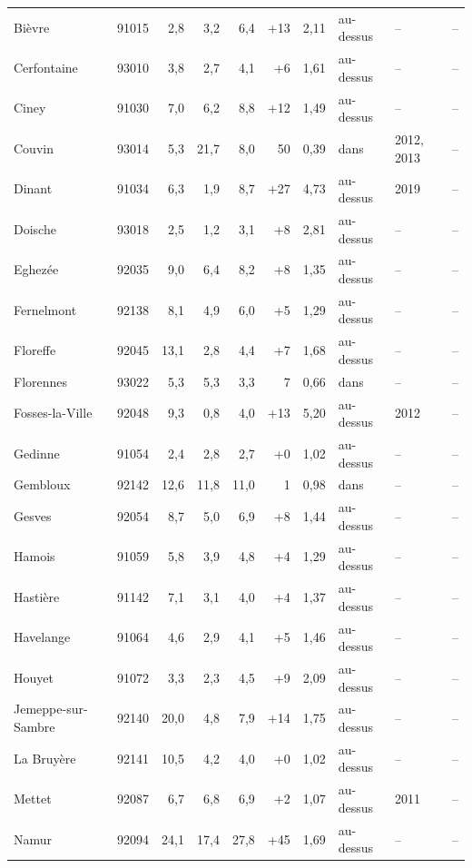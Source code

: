 \begin{longtable}{lrrrrrrlll}
Bièvre & 91015 & 2{,}8 & 3{,}2 & 6{,}4 & +13 & 2{,}11 & au-dessus & -- & -- \\
Cerfontaine & 93010 & 3{,}8 & 2{,}7 & 4{,}1 & +6 & 1{,}61 & au-dessus & -- & -- \\
Ciney & 91030 & 7{,}0 & 6{,}2 & 8{,}8 & +12 & 1{,}49 & au-dessus & -- & -- \\
Couvin & 93014 & 5{,}3 & 21{,}7 & 8{,}0 & \textminus{}50 & 0{,}39 & dans & 2012, 2013 & -- \\
Dinant & 91034 & 6{,}3 & 1{,}9 & 8{,}7 & +27 & 4{,}73 & au-dessus & 2019 & -- \\
Doische & 93018 & 2{,}5 & 1{,}2 & 3{,}1 & +8 & 2{,}81 & au-dessus & -- & -- \\
Eghezée & 92035 & 9{,}0 & 6{,}4 & 8{,}2 & +8 & 1{,}35 & au-dessus & -- & -- \\
Fernelmont & 92138 & 8{,}1 & 4{,}9 & 6{,}0 & +5 & 1{,}29 & au-dessus & -- & -- \\
Floreffe & 92045 & 13{,}1 & 2{,}8 & 4{,}4 & +7 & 1{,}68 & au-dessus & -- & -- \\
Florennes & 93022 & 5{,}3 & 5{,}3 & 3{,}3 & \textminus{}7 & 0{,}66 & dans & -- & -- \\
Fosses-la-Ville & 92048 & 9{,}3 & 0{,}8 & 4{,}0 & +13 & 5{,}20 & au-dessus & 2012 & -- \\
Gedinne & 91054 & 2{,}4 & 2{,}8 & 2{,}7 & +0 & 1{,}02 & au-dessus & -- & -- \\
Gembloux & 92142 & 12{,}6 & 11{,}8 & 11{,}0 & \textminus{}1 & 0{,}98 & dans & -- & -- \\
Gesves & 92054 & 8{,}7 & 5{,}0 & 6{,}9 & +8 & 1{,}44 & au-dessus & -- & -- \\
Hamois & 91059 & 5{,}8 & 3{,}9 & 4{,}8 & +4 & 1{,}29 & au-dessus & -- & -- \\
Hastière & 91142 & 7{,}1 & 3{,}1 & 4{,}0 & +4 & 1{,}37 & au-dessus & -- & -- \\
Havelange & 91064 & 4{,}6 & 2{,}9 & 4{,}1 & +5 & 1{,}46 & au-dessus & -- & -- \\
Houyet & 91072 & 3{,}3 & 2{,}3 & 4{,}5 & +9 & 2{,}09 & au-dessus & -- & -- \\
Jemeppe-sur-Sambre & 92140 & 20{,}0 & 4{,}8 & 7{,}9 & +14 & 1{,}75 & au-dessus & -- & -- \\
La Bruyère & 92141 & 10{,}5 & 4{,}2 & 4{,}0 & +0 & 1{,}02 & au-dessus & -- & -- \\
Mettet & 92087 & 6{,}7 & 6{,}8 & 6{,}9 & +2 & 1{,}07 & au-dessus & 2011 & -- \\
Namur & 92094 & 24{,}1 & 17{,}4 & 27{,}8 & +45 & 1{,}69 & au-dessus & -- & -- \\

\end{longtable}
